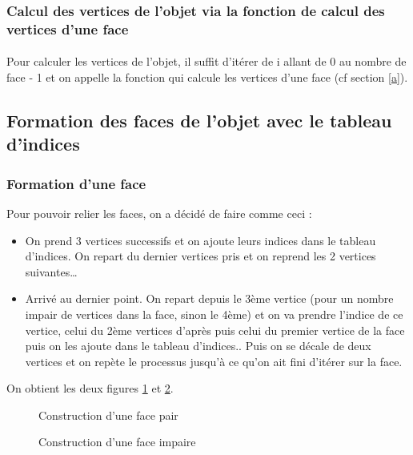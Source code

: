 \documentclass[article, backcover, french, nodocumentinfo]{upmethodology-document}
\begin{document}
	\subsubsection{Calcul des vertices de l'objet via la fonction de calcul des vertices d'une face}
	\paragraph{} Pour calculer les vertices de l'objet, il suffit d'itérer de i allant de 0 au nombre de face - 1 et on appelle la fonction qui calcule les vertices d'une face (cf section \ref{a}).
	\subsection{Formation des faces de l'objet avec le tableau d'indices}
	\subsubsection{Formation d'une face}
	Pour pouvoir relier les faces, on a décidé de faire comme ceci : 
	\begin{itemize}
		\item On prend 3 vertices successifs et on ajoute leurs indices dans le tableau d'indices. On repart du dernier vertices pris et on reprend les 2 vertices suivantes\ldots
		\item Arrivé au dernier point. On repart depuis le 3ème vertice (pour un nombre impair de vertices dans la face, sinon le 4ème) et on va prendre l'indice de ce vertice, celui du 2ème vertices d'après puis celui du premier vertice de la face puis on les ajoute dans le tableau d'indices.. Puis on se décale de deux vertices et on repète le processus jusqu'à ce qu'on ait fini d'itérer sur la face.
	\end{itemize}
	On obtient les deux figures \ref{fig:face_1} et \ref{fig:face_2}.
	\begin{figure}[H]
			\centering%
			\caption{Construction d'une face pair}%
			\label{fig:face_1}%
	\end{figure}
	\begin{figure}[H]
			\centering%
			\caption{Construction d'une face impaire}%
			\label{fig:face_2}%
	\end{figure}
\end{document}
